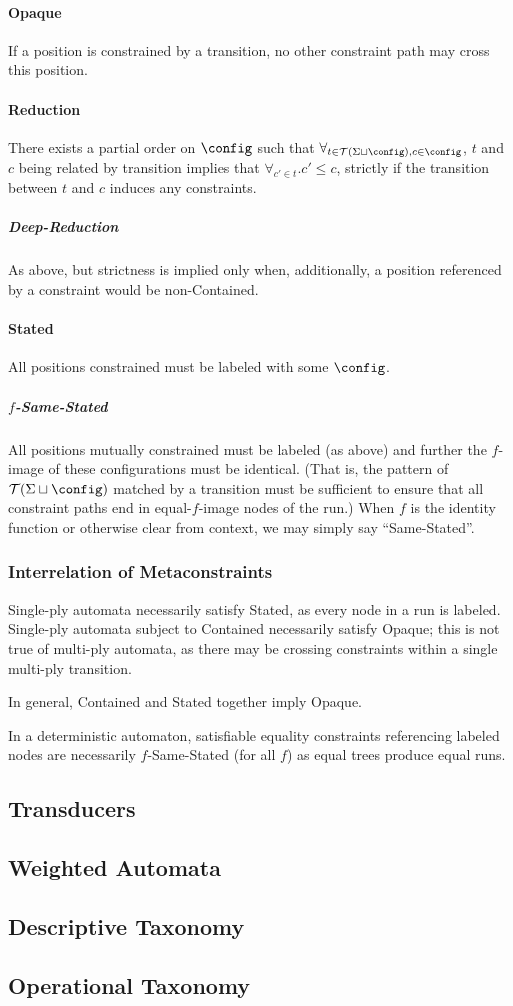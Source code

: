 \paragraph{Opaque} If a position is constrained by a transition, no other
constraint path may cross this position. 

\paragraph{Reduction} There exists a partial order on $\config$ such that
$\forall_{t \in \mathcal{T}(\Sigma \sqcup \config), c \in \config}$, $t$ and
$c$ being related by transition implies that $\forall_{c' \in t} . c' \le
c$, strictly if the transition between $t$ and $c$ induces any constraints.

\subparagraph{Deep-Reduction} As above, but strictness is implied only when,
additionally, a position referenced by a constraint would be non-Contained.

\paragraph{Stated} All positions constrained must be labeled with some 
$\config$.

\subparagraph{$f$-Same-Stated} All positions mutually constrained must be
labeled (as above) and further the $f$-image of these configurations must be
identical.  (That is, the pattern of $\mathcal{T}(\Sigma \sqcup \config)$
matched by a transition must be sufficient to ensure that all constraint
paths end in equal-$f$-image nodes of the run.)  When $f$ is the identity
function or otherwise clear from context, we may simply say ``Same-Stated''.

\subsubsection{Interrelation of Metaconstraints}

Single-ply automata necessarily satisfy Stated, as every node in a run is
labeled.  Single-ply automata subject to Contained necessarily satisfy
Opaque; this is not true of multi-ply automata, as there may be crossing
constraints within a single multi-ply transition.

In general, Contained and Stated together imply Opaque.

In a deterministic automaton, satisfiable equality constraints referencing
labeled nodes are necessarily $f$-Same-Stated (for all $f$) as equal trees
produce equal runs.

\subsection{Transducers}

\subsection{Weighted Automata}

\subsection{Descriptive Taxonomy}

\subsection{Operational Taxonomy}
